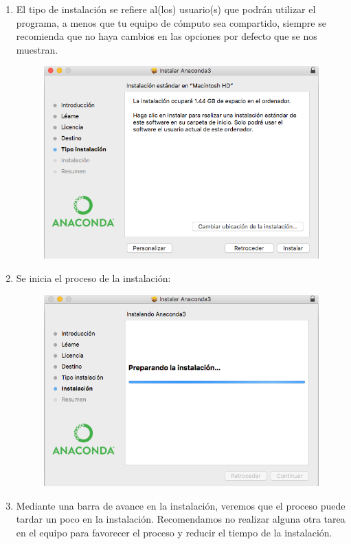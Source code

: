 \documentclass[12pt]{article}
\begin{document}
\begin{enumerate}
\item El tipo de instalación se refiere al(los) usuario(s) que podrán utilizar el programa, a menos que tu equipo de cómputo sea compartido, siempre se recomienda que no haya cambios en las opciones por defecto que se nos muestran.
\begin{figure}[H]
	\centering
	\includegraphics[scale=0.5]{Imagenes/Instalacion_Anaconda_01_iOS_08} 
\end{figure}
\item Se inicia el proceso de la instalación:
\begin{figure}[H]
	\centering
	\includegraphics[scale=0.5]{Imagenes/Instalacion_Anaconda_01_iOS_09} 
\end{figure}
\item Mediante una barra de avance en la instalación, veremos que el proceso puede tardar un poco en la instalación. Recomendamos no realizar alguna otra tarea en el equipo para favorecer el proceso y reducir el tiempo de la instalación.

\end{enumerate}
\end{document}
